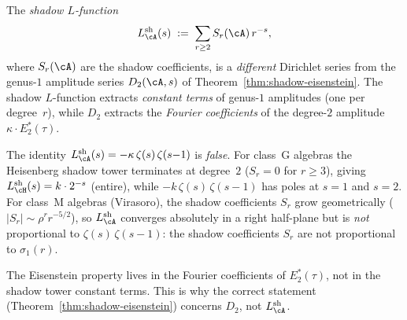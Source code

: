 \begin{remark}
\label{rem:shadow-eisenstein-correct-scope}
The \emph{shadow $L$-function}
\begin{equation}\label{eq:shadow-l-function-def}
 L_\cA^{\mathrm{sh}}(s)
 \;:=\;
 \sum_{r \ge 2} S_r(\cA)\,r^{-s},
\end{equation}
where $S_r(\cA)$ are the shadow coefficients, is a
\emph{different} Dirichlet series from the genus-$1$ amplitude
series $D_2(\cA, s)$ of
Theorem~\ref{thm:shadow-eisenstein}. The shadow $L$-function
extracts \emph{constant terms} of genus-$1$ amplitudes
(one per degree~$r$), while $D_2$ extracts the
\emph{Fourier coefficients} of the degree-$2$ amplitude
$\kappa \cdot E_2^*(\tau)$.

The identity
$L_\cA^{\mathrm{sh}}(s) = -\kappa\,\zeta(s)\,\zeta(s{-}1)$
is \emph{false}. For class~G algebras the Heisenberg shadow
tower terminates at degree~$2$ ($S_r = 0$ for $r \ge 3$),
giving $L_\cH^{\mathrm{sh}}(s) = k \cdot 2^{-s}$ (entire),
while $-k\,\zeta(s)\,\zeta(s{-}1)$ has poles at
$s = 1$ and $s = 2$. For class~M algebras (Virasoro),
the shadow coefficients $S_r$ grow geometrically
($|S_r| \sim \rho^r r^{-5/2}$), so $L_\cA^{\mathrm{sh}}$
converges absolutely in a right half-plane but is \emph{not}
proportional to $\zeta(s)\,\zeta(s{-}1)$: the shadow
coefficients $S_r$ are not proportional to
$\sigma_1(r)$.

The Eisenstein property lives in the Fourier coefficients of
$E_2^*(\tau)$, not in the shadow tower constant terms. This
is why the correct statement
(Theorem~\ref{thm:shadow-eisenstein}) concerns $D_2$, not
$L_\cA^{\mathrm{sh}}$.
\end{remark}


